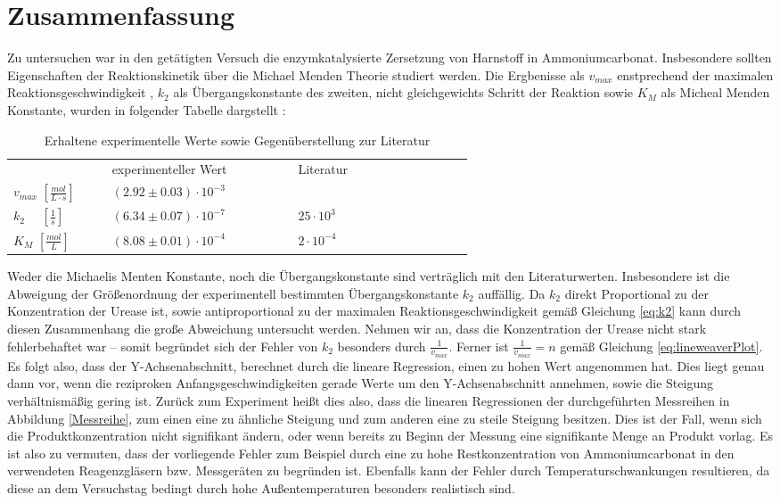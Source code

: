  

\section{Zusammenfassung}
Zu untersuchen war in den getätigten Versuch die enzymkatalysierte Zersetzung von Harnstoff in Ammoniumcarbonat. Insbesondere sollten Eigenschaften der Reaktionskinetik über die Michael Menden Theorie studiert werden. Die Ergbenisse als $v_{max}$ enstprechend der maximalen Reaktionsgeschwindigkeit , $k_2$ als Übergangskonstante des zweiten, nicht gleichgewichts Schritt der Reaktion sowie $K_M$ als Micheal Menden Konstante, wurden in folgender Tabelle dargstellt :
\begin{table}[H]
	\centering
	\label{Erg}
	\caption{Erhaltene experimentelle Werte sowie Gegenüberstellung zur Literatur}
	\renewcommand*{\arraystretch}{1.4}
	\begin{tabular}{C{0.1\linewidth}|C{0.25\linewidth}C{0.25\linewidth}}
				& experimenteller Wert & Literatur\cite{otto} \\
		$ v_{max}\,\, [\si{\frac{mol}{L\cdot s}}] $ & $(2.92 \pm 0.03) \cdot 10^{-3}$ &   \\
		$k_2\,\,\,\,\,\,\,\, [\si{\frac{1}{s}}]$ & $(6.34 \pm 0.07)\cdot 10^{-7}$ &  $25 \cdot 10^3$\\
		$K_M\,\, [\si{\frac{mol}{L}}]$& $(8.08 \pm 0.01) \cdot 10^{-4}$& $2 \cdot 10^{-4}$\\
	\end{tabular}
\end{table}
Weder die Michaelis Menten Konstante, noch die Übergangskonstante sind verträglich mit den Literaturwerten. Insbesondere ist die Abweigung der Größenordnung der experimentell bestimmten Übergangskonstante $k_2$ auffällig. Da $k_2$ direkt Proportional zu der Konzentration der Urease ist, sowie antiproportional zu der maximalen Reaktionsgeschwindigkeit gemäß Gleichung \ref{eq:k2} kann durch diesen Zusammenhang die große Abweichung untersucht werden. Nehmen wir an, dass die Konzentration der Urease nicht stark fehlerbehaftet war -- somit begründet sich der Fehler von $k_2$ besonders durch $\frac{1}{v_{max}}$. Ferner ist $\frac{1}{v_{max}} = n$ gemäß Gleichung \ref{eq:lineweaverPlot}. Es folgt also, dass der Y-Achsenabschnitt, berechnet durch die lineare Regression, einen zu hohen Wert angenommen hat. Dies liegt genau dann vor, wenn die reziproken Anfangsgeschwindigkeiten gerade Werte um den Y-Achsenabschnitt annehmen, sowie die Steigung verhältnismäßig gering ist. Zurück zum Experiment heißt dies also, dass die linearen Regressionen der durchgeführten Messreihen in Abbildung \ref{Messreihe}, zum einen eine zu ähnliche Steigung und zum anderen eine zu steile Steigung besitzen. Dies ist der Fall, wenn sich die Produktkonzentration nicht signifikant ändern, oder wenn bereits zu Beginn der Messung eine signifikante Menge an Produkt vorlag. Es ist also zu vermuten, dass der vorliegende Fehler zum Beispiel durch eine zu hohe Restkonzentration von Ammoniumcarbonat in den verwendeten Reagenzgläsern bzw. Messgeräten zu begründen ist. Ebenfalls kann der Fehler durch Temperaturschwankungen resultieren, da diese an dem Versuchstag bedingt durch hohe Außentemperaturen besonders realistisch sind.




